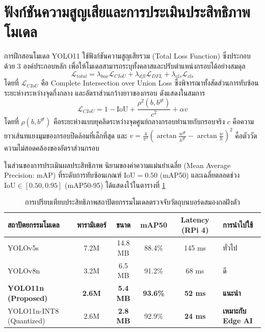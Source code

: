 \section{ฟังก์ชันความสูญเสียและการประเมินประสิทธิภาพโมเดล}

การฝึกสอนโมเดล YOLO11 ใช้ฟังก์ชันความสูญเสียรวม (Total Loss Function) ซึ่งประกอบด้วย 3 องค์ประกอบหลัก เพื่อให้โมเดลสามารถระบุทั้งคลาสและปรับตำแหน่งกรอบได้อย่างสมดุล
\begin{equation}
    \mathcal{L}_{total} = \lambda_{box} \mathcal{L}_{CIoU} + \lambda_{dfl} \mathcal{L}_{DFL} + \lambda_{cls} \mathcal{L}_{cls}
\end{equation}
\noindent โดยที่ $\mathcal{L}_{CIoU}$ คือ Complete Intersection over Union Loss ซึ่งพิจารณาทั้งสัดส่วนการทับซ้อน ระยะห่างระหว่างจุดกึ่งกลาง และอัตราส่วนกว้างยาวของกรอบ ดังแสดงในสมการ
\begin{equation}
    \mathcal{L}_{CIoU} = 1 - \text{IoU} + \frac{\rho^2(b, b^{gt})}{c^2} + \alpha v
\end{equation}
\noindent โดยที่ $\rho(b, b^{gt})$ คือระยะห่างแบบยุคลิดระหว่างจุดศูนย์กลางกรอบทำนายกับกรอบจริง $c$ คือความยาวเส้นทแยงมุมของกรอบปิดล้อมที่เล็กที่สุด และ $v = \frac{4}{\pi^2} \left( \arctan\frac{w^{gt}}{h^{gt}} - \arctan\frac{w}{h} \right)^2$ คือตัววัดความไม่สอดคล้องของอัตราส่วนกรอบ

ในส่วนของการประเมินผลประสิทธิภาพ นิยามของค่าความแม่นยำเฉลี่ย (Mean Average Precision: mAP) ที่ระดับการทับซ้อนเกณฑ์ $\text{IoU} = 0.50$ (mAP50) และเฉลี่ยตลอดช่วง $\text{IoU} \in [0.50, 0.95]$ (mAP50-95) ได้แสดงไว้ใน\mbox{ตารางที่} \ref{tab:edge_ai_benchmarks}

\begin{table}[H]
\centering
\small
\caption{การเปรียบเทียบประสิทธิภาพสถาปัตยกรรมโมเดลตรวจจับวัตถุบนบอร์ดสมองกลฝังตัว}
\label{tab:edge_ai_benchmarks}
\begin{tabularx}{\textwidth}{p{3.6cm}ccccX}
\toprule
\textbf{สถาปัตยกรรมโมเดล} & \textbf{พารามิเตอร์} & \textbf{ขนาด} & \textbf{mAP50} & \textbf{Latency (RPi 4)} & \textbf{การนำไปใช้} \\
\midrule
YOLOv5s & 7.2M & 14.8 MB & 88.4\% & 145 ms & ทั่วไป \\
YOLOv8n & 3.2M & 6.5 MB & 91.2\% & 68 ms & ดี \\
\textbf{YOLO11n (Proposed)} & \textbf{2.6M} & \textbf{5.4 MB} & \textbf{93.6\%} & \textbf{52 ms} & \textbf{แนะนำ} \\
YOLO11n-INT8 (Quantized) & 2.6M & \textbf{2.8 MB} & 92.9\% & \textbf{24 ms} & \textbf{เหมาะกับ Edge AI} \\
\bottomrule
\end{tabularx}
\end{table}

